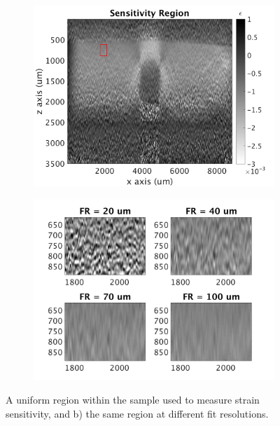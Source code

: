\begin{figure}	
	\centering
	\begin{subfigure}{0.49\textwidth}
		\centering
		\includegraphics[width=\textwidth]{figures/sensitivity_regions.png}
	\end{subfigure}
	\begin{subfigure}{0.49\textwidth}
		\centering
		\includegraphics[width=\textwidth]{figures/regions_zoomed.png}
	\end{subfigure}
	\caption{A uniform region within the sample used to measure strain sensitivity, and b) the same region at different fit resolutions.}
	\label{sensivity_region}
\end{figure}

